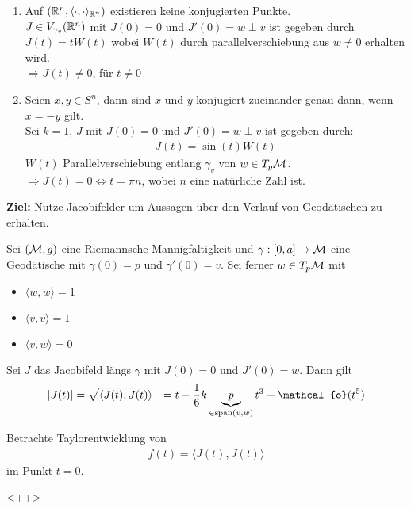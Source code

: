 \begin{bsp}
\begin{enumerate}
    \item Auf $(\mathbb{R}^n , \langle \cdot , \cdot \rangle_{\mathbb{R}^n})$ existieren keine konjugierten Punkte.\\
    $J\in V_{\gamma_v}(\mathbb{R}^n)$ mit $J(0)=0$ und $J'(0)=w \perp v$ 
    ist gegeben durch $J(t)=t W(t)$ wobei $W(t)$ durch parallelverschiebung aus 
    $w\neq 0$ erhalten wird.\\
    $\Rightarrow J(t)\neq 0$, für $t\neq 0 $
\item Seien $x, y \in S^n$, dann sind $x$ und $y$ konjugiert zueinander
    genau dann, wenn $x = -y$ gilt.\\
    Sei $k=1$, $J$ mit $J(0)=0$ und $J'(0)=w \perp v$ ist gegeben durch:
    \begin{align*}
        J(t) = \sin (t) W(t)
    \end{align*}
    $W(t)$ Parallelverschiebung entlang $\gamma_v$ von $w \in T_p\mathcal{M}$.\\
    $\Rightarrow J(t)=0 \Leftrightarrow t = \pi n$, wobei $n$ eine natürliche Zahl ist.
\end{enumerate}
\end{bsp}

\textbf{Ziel:}
Nutze Jacobifelder um Aussagen über den Verlauf von Geodätischen zu erhalten.

\begin{lem}
    Sei $(\mathcal{M} , g)$ eine Riemannsche Mannigfaltigkeit und 
    $\gamma : [0,a] \to\mathcal{M}$ eine Geodätische mit
    $\gamma (0) = p$ und $\gamma ' (0) = v$.
    Sei ferner $w \in T_p\mathcal{M}$ mit
    \begin{itemize}
        \item $\langle w , w \rangle = 1$
        \item $\langle v, v \rangle = 1$
        \item $\langle v, w \rangle = 0$
    \end{itemize}
    Sei $J$ das Jacobifeld längs $\gamma$ mit $J(0)=0$ und $J'(0)=w$.
    Dann gilt 
    \begin{align*}
        \abs{J(t)} &= \sqrt{\langle J(t) , J(t) \rangle} 
        &= t - \frac{1}{6} k \underbrace{p}_{\in \text{span}(v, w)} t^3 + \mathcal{o}(t^5)
    \end{align*}
\end{lem}
\begin{bew}
Betrachte Taylorentwicklung von 
\begin{align*}
    f(t) = \langle J(t),J(t) \rangle 
\end{align*}
im Punkt $t=0$.
\end{bew}<++>















